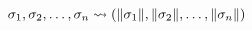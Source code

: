 \documentclass[acmlarge]{acmart}
\begin{document}
  \begin{figure}
    \begin{mdframed}

      \begin{center}
      \end{center}

      \[ \utrans{\tpoly_1, \tpoly_2, \ldots, \tpoly_n}{(\utovar{\tpoly_1}, \utovar{\tpoly_2}, \ldots, \utovar{\tpoly_n})} \]

      \vspace{0.3cm}

      \begin{center}
        \framebox{$\entails{\icontext; \gcontext}{\utrans{\hastype{\lterm}{\tmono}}{\lterm}}$}
      \end{center}

      \medskip

      \begin{prooftree}
      \end{prooftree}

      \begin{prooftree}
      \end{prooftree}

      \begin{prooftree}
      \end{prooftree}


\end{mdframed}
\end{figure}
\end{document}
